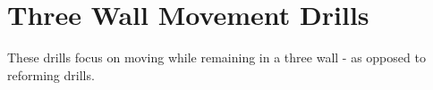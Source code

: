 \section*{Three Wall Movement Drills}
These drills focus on moving while remaining in a three wall - as opposed to reforming drills. 
